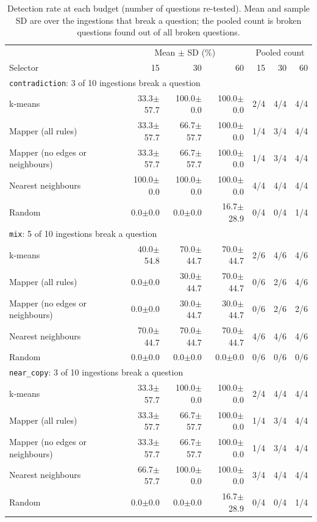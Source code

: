 \begin{table}[htbp]
  \centering
  \footnotesize
  \setlength{\tabcolsep}{4pt}
  \begin{tabular}{lrrrrrr}
    \hline
    & \multicolumn{3}{c}{Mean $\pm$ SD (\%)} & \multicolumn{3}{c}{Pooled count} \\
    Selector & 15 & 30 & 60 & 15 & 30 & 60 \\
    \hline
    \multicolumn{7}{l}{\texttt{contradiction}: 3 of 10 ingestions break a question} \\
    k-means & 33.3$\pm$57.7 & 100.0$\pm$0.0 & 100.0$\pm$0.0 & 2/4 & 4/4 & 4/4 \\
    Mapper (all rules) & 33.3$\pm$57.7 & 66.7$\pm$57.7 & 100.0$\pm$0.0 & 1/4 & 3/4 & 4/4 \\
    Mapper (no edges or neighbours) & 33.3$\pm$57.7 & 66.7$\pm$57.7 & 100.0$\pm$0.0 & 1/4 & 3/4 & 4/4 \\
    Nearest neighbours & 100.0$\pm$0.0 & 100.0$\pm$0.0 & 100.0$\pm$0.0 & 4/4 & 4/4 & 4/4 \\
    Random & 0.0$\pm$0.0 & 0.0$\pm$0.0 & 16.7$\pm$28.9 & 0/4 & 0/4 & 1/4 \\
    \hline
    \multicolumn{7}{l}{\texttt{mix}: 5 of 10 ingestions break a question} \\
    k-means & 40.0$\pm$54.8 & 70.0$\pm$44.7 & 70.0$\pm$44.7 & 2/6 & 4/6 & 4/6 \\
    Mapper (all rules) & 0.0$\pm$0.0 & 30.0$\pm$44.7 & 70.0$\pm$44.7 & 0/6 & 2/6 & 4/6 \\
    Mapper (no edges or neighbours) & 0.0$\pm$0.0 & 30.0$\pm$44.7 & 30.0$\pm$44.7 & 0/6 & 2/6 & 2/6 \\
    Nearest neighbours & 70.0$\pm$44.7 & 70.0$\pm$44.7 & 70.0$\pm$44.7 & 4/6 & 4/6 & 4/6 \\
    Random & 0.0$\pm$0.0 & 0.0$\pm$0.0 & 0.0$\pm$0.0 & 0/6 & 0/6 & 0/6 \\
    \hline
    \multicolumn{7}{l}{\texttt{near\_copy}: 3 of 10 ingestions break a question} \\
    k-means & 33.3$\pm$57.7 & 100.0$\pm$0.0 & 100.0$\pm$0.0 & 2/4 & 4/4 & 4/4 \\
    Mapper (all rules) & 33.3$\pm$57.7 & 66.7$\pm$57.7 & 100.0$\pm$0.0 & 1/4 & 3/4 & 4/4 \\
    Mapper (no edges or neighbours) & 33.3$\pm$57.7 & 66.7$\pm$57.7 & 100.0$\pm$0.0 & 1/4 & 3/4 & 4/4 \\
    Nearest neighbours & 66.7$\pm$57.7 & 100.0$\pm$0.0 & 100.0$\pm$0.0 & 3/4 & 4/4 & 4/4 \\
    Random & 0.0$\pm$0.0 & 0.0$\pm$0.0 & 16.7$\pm$28.9 & 0/4 & 0/4 & 1/4 \\
    \hline
  \end{tabular}
  \caption{Detection rate at each budget (number of questions re-tested). Mean and sample SD are over the ingestions that break a question; the pooled count is broken questions found out of all broken questions.}
  \label{tab:main-results}
\end{table}

